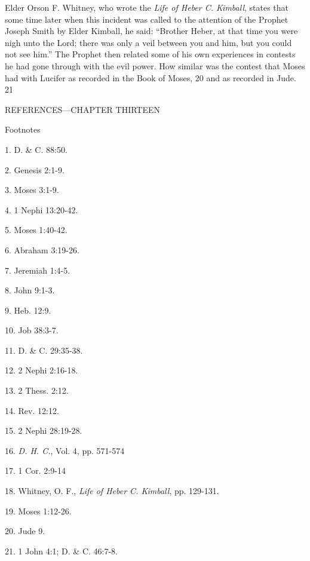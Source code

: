 Elder Orson F. Whitney, who wrote the \textit{Life of Heber C. Kimball}, states that some time later
when this incident was called to the attention of the Prophet Joseph Smith by Elder Kimball,
he said: ``Brother Heber, at that time you were nigh unto the Lord; there was only a veil
between you and him, but you could not see him.'' The Prophet then related some of his own
experiences in contests he had gone through with the evil power. How similar was the contest
that Moses had with Lucifer as recorded in the Book of Moses, 20 and as recorded in Jude.
21

\newpage
REFERENCES—CHAPTER THIRTEEN

Footnotes

1. D. \& C. 88:50.

2. Genesis 2:1-9.

3. Moses 3:1-9.

4. 1 Nephi 13:20-42.

5. Moses 1:40-42.

6. Abraham 3:19-26.

7. Jeremiah 1:4-5.

8. John 9:1-3.

9. Heb. 12:9.

10. Job 38:3-7.

11. D. \& C. 29:35-38.

12. 2 Nephi 2:16-18.

13. 2 Thess. 2:12.

14. Rev. 12:12.

15. 2 Nephi 28:19-28.

16. \textit{D. H. C.}, Vol. 4, pp. 571-574

17. 1 Cor. 2:9-14

18. Whitney, O. F., \textit{Life of Heber C. Kimball}, pp. 129-131.

19. Moses 1:12-26.

20. Jude 9.

21. 1 John 4:1; D. \& C. 46:7-8.

